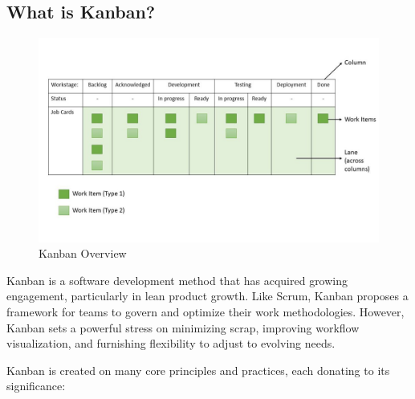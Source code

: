 \documentclass[conference]{IEEEtran}
\begin{document}
\subsection{What is Kanban?}
\begin{figure}[h!]
    \centering
    \includegraphics[width=1\linewidth]{k1.jpg}
    \caption{Kanban Overview}
    \label{fig:Kanban}
\end{figure}
Kanban is a software development method that has acquired growing engagement, particularly in lean product growth. Like Scrum, Kanban proposes a framework for teams to govern and optimize their work methodologies. However, Kanban sets a powerful stress on minimizing scrap, improving workflow visualization, and furnishing flexibility to adjust to evolving needs.\cite{corona2013review}

Kanban is created on many core principles and practices, each donating to its significance:
\end{document}
